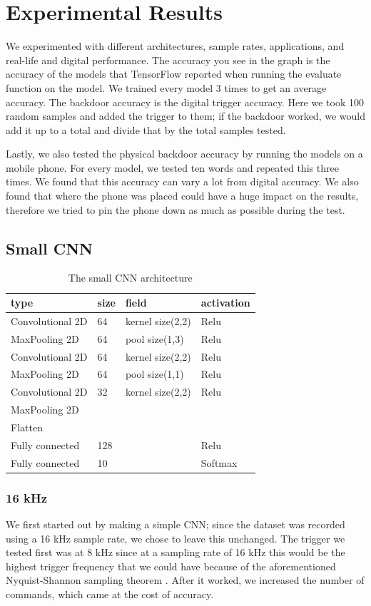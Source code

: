 \documentclass{report}
\theoremstyle{definition}
\theoremstyle{remark}
\begin{document}
\chapter{Experimental Results} 
\label{chap:experimental_results}
We experimented with different architectures, sample rates, applications, and real-life and digital performance. The accuracy you see in the graph is the accuracy of the models that TensorFlow reported when running the evaluate function on the model. We trained every model 3 times to get an average accuracy. The backdoor accuracy is the digital trigger accuracy. Here we took 100 random samples and added the trigger to them; if the backdoor worked, we would add it up to a total and divide that by the total samples tested. 

Lastly, we also tested the physical backdoor accuracy by running the models on a mobile phone. For every model, we tested ten words and repeated this three times. We found that this accuracy can vary a lot from digital accuracy. We also found that where the phone was placed could have a huge impact on the results, therefore we tried to pin the phone down as much as possible during the test.
\section{Small CNN}
\begin{table}[!hbt]
\centering
\begin{tabular}{llll}
\hline
type & size & field & activation \\ \hline
Convolutional 2D & 64 & kernel size(2,2) & Relu \\
MaxPooling 2D & 64 & pool size(1,3) & Relu \\
Convolutional 2D & 64 & kernel size(2,2) & Relu \\
MaxPooling 2D & 64 & pool size(1,1) & Relu \\
Convolutional 2D & 32 & kernel size(2,2) & Relu \\
MaxPooling 2D & & &  \\
Flatten & & &  \\
Fully connected & 128 & & Relu  \\
Fully connected & 10 & & Softmax \\ \hline
\end{tabular}
\caption{The small CNN architecture}
\label{tab:small_cnn}
\end{table}

\subsection{16 kHz}
We first started out by making a simple CNN; since the dataset was recorded using a 16 kHz sample rate, we chose to leave this unchanged. The trigger we tested first was at 8 kHz since at a sampling rate of 16 kHz this would be the highest trigger frequency that we could have because of the aforementioned Nyquist-Shannon sampling theorem \cite{por2019nyquist}. After it worked, we increased the number of commands, which came at the cost of accuracy. \\\\
\end{document}
